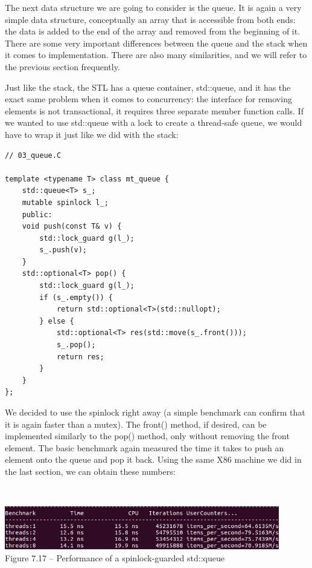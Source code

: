 
The next data structure we are going to consider is the queue. It is again a very simple data  structure, conceptually an array that is accessible from both ends: the data is added to the  end of the array and removed from the beginning of it. There are some very important  differences between the queue and the stack when it comes to implementation. There are  also many similarities, and we will refer to the previous section frequently. 

Just like the stack, the STL has a queue container, std::queue, and it has the exact  same problem when it comes to concurrency: the interface for removing elements is  not transactional, it requires three separate member function calls. If we wanted to use std::queue with a lock to create a thread-safe queue, we would have to wrap it just like we did with the stack:

\begin{lstlisting}[style=styleCXX]
// 03_queue.C
	
template <typename T> class mt_queue {
	std::queue<T> s_;
	mutable spinlock l_;
	public:
	void push(const T& v) {
		std::lock_guard g(l_);
		s_.push(v);
	}
	std::optional<T> pop() {
		std::lock_guard g(l_);
		if (s_.empty()) {
			return std::optional<T>(std::nullopt);
		} else {
			std::optional<T> res(std::move(s_.front()));
			s_.pop();
			return res;
		}
	}
};
\end{lstlisting}

We decided to use the spinlock right away (a simple benchmark can confirm that it is again faster than a mutex). The front() method, if desired, can be implemented similarly to the pop() method, only without removing the front element. The basic benchmark again measured the time it takes to push an element onto the queue and pop it back. Using the same X86 machine we did in the last section, we can obtain these  numbers:

\hspace*{\fill} \\ %
\begin{center}
\includegraphics[width=0.9\textwidth]{content/2/chapter7/images/17.jpg}\\
Figure 7.17 – Performance of a spinlock-guarded std::queue
\end{center}

